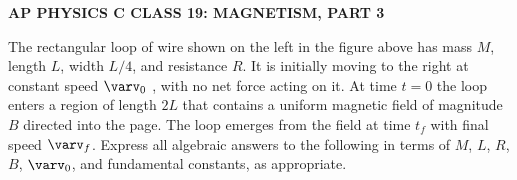 \documentclass{../../oss-apphys-exam}
\begin{document}
\genheader

\begin{center}
  \textbf{AP PHYSICS C CLASS 19: MAGNETISM, PART 3}
\end{center}
  

\begin{questions}
  \question The rectangular loop of wire shown on the left in the figure above
  has mass $M$, length $L$, width $L/4$, and resistance $R$. It is initially
  moving to the right at constant speed $\varv_0$ , with no net force acting on
  it. At time $t=0$ the loop enters a region of length $2L$ that contains a
  uniform magnetic field of magnitude $B$ directed into the page. The loop
  emerges from the field at time $t_f$ with final speed $\varv_f$. Express all
  algebraic answers to the following in terms of $M$, $L$, $R$, $B$, $\varv_0$,
  and fundamental constants, as appropriate.
\end{questions}
\end{document}
